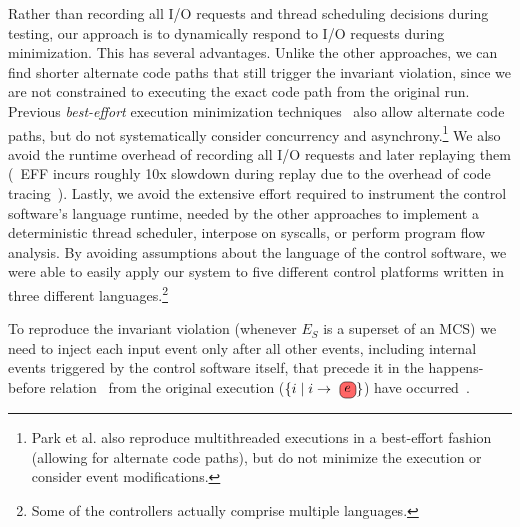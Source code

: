  Rather than recording all
I/O requests and thread scheduling decisions during testing, our approach is
to dynamically respond to I/O requests during minimization. This has several advantages. Unlike
the other approaches, we can find shorter alternate code paths that still
trigger the invariant violation, since we are not constrained to executing the exact code path
from the original run. Previous {\em best-effort} execution minimization
techniques~\cite{clause2007technique,tucek2007triage} also allow alternate
code paths, but do not systematically
consider concurrency and asynchrony.\footnote{Park et al.\cite{park2009pres}
also reproduce multithreaded executions in a best-effort fashion (allowing for
alternate code paths), but do not minimize the execution or consider event
modifications.}
We also avoid the runtime overhead of recording all I/O
requests and later replaying them (\eg~EFF incurs roughly 10x slowdown during
replay due to the overhead of code tracing~\cite{Lee:2011:TGR:1993498.1993528}). Lastly,
we avoid the extensive effort required to instrument the control software's language runtime,
needed by the other approaches to implement a deterministic thread scheduler, interpose on syscalls,
or perform program flow analysis. By avoiding assumptions about the language of the control software,
we were able to easily apply our system to five different control platforms
written in three different languages.\footnote{Some of the controllers
actually comprise multiple languages.} %



 To reproduce the invariant violation (whenever $E_S$ is a superset of an MCS)
we need to inject each input event \external{} only after all other
events, including internal events triggered by the control software itself,
that precede it in the
happens-before relation~\cite{Lamport:1978:TCO:359545.359563} from the
original execution ($\{i \mid i \rightarrow \text{\external{}}\}$) have
occurred~\cite{tel2000introduction}.

